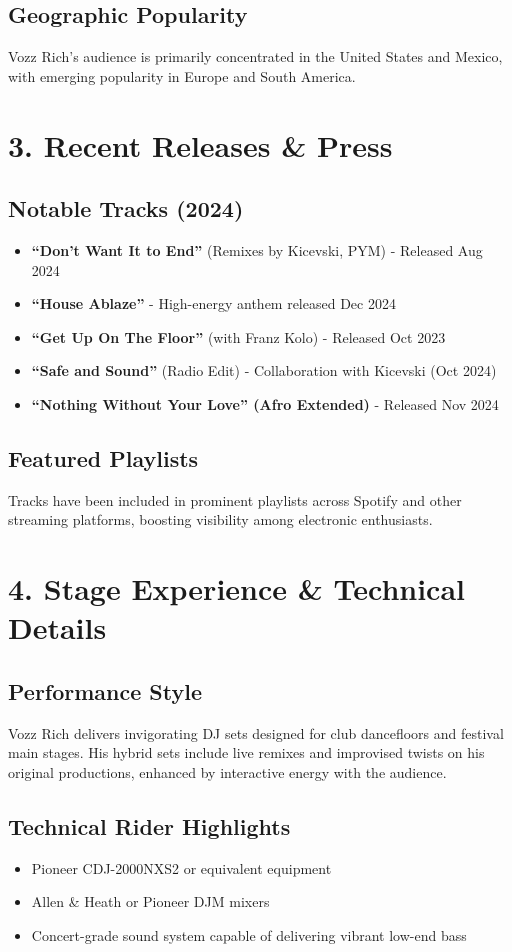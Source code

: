\documentclass[12pt]{article}
\begin{document}
\subsection*{Geographic Popularity}
Vozz Rich’s audience is primarily concentrated in the United States and Mexico, with emerging popularity in Europe and South America.

\section*{3. Recent Releases \& Press}
\subsection*{Notable Tracks (2024)}
\begin{itemize}
    \item \textbf{“Don’t Want It to End”} (Remixes by Kicevski, PYM) - Released Aug 2024
    \item \textbf{“House Ablaze”} - High-energy anthem released Dec 2024
    \item \textbf{“Get Up On The Floor”} (with Franz Kolo) - Released Oct 2023
    \item \textbf{“Safe and Sound”} (Radio Edit) - Collaboration with Kicevski (Oct 2024)
    \item \textbf{“Nothing Without Your Love” (Afro Extended)} - Released Nov 2024
\end{itemize}

\subsection*{Featured Playlists}
Tracks have been included in prominent playlists across Spotify and other streaming platforms, boosting visibility among electronic enthusiasts.

\section*{4. Stage Experience \& Technical Details}
\subsection*{Performance Style}
Vozz Rich delivers invigorating DJ sets designed for club dancefloors and festival main stages. His hybrid sets include live remixes and improvised twists on his original productions, enhanced by interactive energy with the audience.

\subsection*{Technical Rider Highlights}
\begin{itemize}
    \item Pioneer CDJ-2000NXS2 or equivalent equipment
    \item Allen \& Heath or Pioneer DJM mixers
    \item Concert-grade sound system capable of delivering vibrant low-end bass
\end{itemize}
\end{document}
